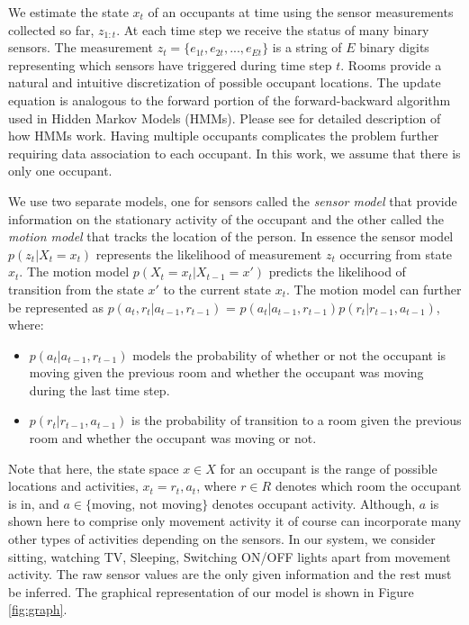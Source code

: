 \documentclass[10pt, conference, compsocconf]{IEEEtran}
\begin{document}
We estimate the state $x_t$ of an occupants at time using the sensor measurements collected so far, $z_{1:t}$. At each time step we receive the status of many binary sensors. The measurement $z_t = \{e_{1t}, e_{2t}, ..., e_{Et}\}$ is a string of $E$ binary digits representing which sensors have triggered during time step $t$. Rooms provide a natural and intuitive discretization of possible occupant locations. The update equation is analogous to the forward portion of the forward-backward algorithm used in Hidden Markov Models (HMMs). Please see \cite{hmm} for detailed description of how HMMs work. Having multiple occupants complicates the problem further requiring data association to each occupant. In this work, we assume that there is only one occupant. 

We use two separate models, one for sensors called the {\it sensor model} that provide information on the stationary activity of the occupant and the other called the {\it motion model} that tracks the location of the person.
In essence the sensor model $p(z_t|X_t = x_t)$ represents the likelihood of measurement $z_t$ occurring from state $x_t$. 
The motion model $p(X_t = x_t|X_{t-1} = x')$ predicts the likelihood of transition from the state $x'$ to the current state $x_t$. The motion model can further be represented as $p(a_t,r_t|a_{t-1}, r_{t-1})$ = $p(a_t|a_{t-1}, r_{t-1})p(r_t|r_{t-1}, a_{t-1})$, where:
\begin{itemize}
\item{$p(a_t|a_{t-1}, r_{t-1})$ models the probability of whether or not the occupant is moving given the previous room and whether the occupant was moving during the last time step.}
\item{$p(r_t|r_{t-1}, a_{t-1})$ is the probability of transition to a room given the previous room and whether the occupant was moving or not.}
\end{itemize}
Note that here, the state space $x \in X$ for an occupant is the range of possible locations and activities, $x_t = {r_t, a_t}$, where $r \in R$ denotes which room the occupant is in, and $a \in \{$moving, not moving$\}$ denotes occupant activity. Although, $a$ is shown here to comprise only movement activity it of course can incorporate many other types of activities depending on the sensors. In our system, we consider sitting, watching TV, Sleeping, Switching ON/OFF lights apart from movement activity. The raw sensor values are the only given information and the rest must be inferred. The graphical representation of our model is shown in Figure \ref{fig:graph}.
\end{document}
